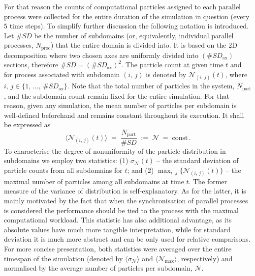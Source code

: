 \documentclass{pracamgren}
\begin{document}
For that reason the counts of computational particles assigned to each parallel process were collected for the entire duration of the simulation in question (every $5$ time steps).
To simplify further discussion the following notation is introduced.
Let $\#SD$ be the number of subdomains (or, equivalently, individual parallel processes, $N_{\text{proc}}$) that the entire domain is divided into.
It is based on the 2D decomposition where two chosen axes are uniformly divided into $(\#SD_{\text{ax}})$ sections, therefore $\#SD = \left( \#SD_{\text{ax}} \right)^2$.
The particle count at given time $t$ and for process associated with subdomain $(i,\,j)$ is denoted by $\mathcal{N}_{(i,\,j)}(t)$, where $i,\,j \in \{ 1, \, \ldots , \, \#SD_{\text{ax}} \}$.
Note that the total number of particles in the system, $N_{\text{part}}$, and the subdomain count remain fixed for the entire simulation.
For that reason, given any simulation, the mean number of particles per subdomain is well-defined beforehand and remains constant throughout its execution.
It shall be expressed as 
\begin{equation}
\langle \mathcal{N}_{(i,\,j)}(t) \rangle \; = \; \frac{N_{\text{part}}}{\#SD} \; := \; \mathcal{N} \; = \; \text{const} \, .
\label{eqn:pfp-avg}
\end{equation}
To characterise the degree of nonuniformity of the particle distribution in subdomains we employ two statistics: (1) $\sigma_{\mathcal{N}}(t)$ -- the standard deviation of particle counts from all subdomains for $t$; and (2) $\max_{i,\,j}\{\mathcal{N}_{(i,\,j)}(t)\}$ -- the maximal number of particles among all subdomains at time $t$.
The former measure of the variance of distribution is self-explanatory.
As for the latter, it is mainly motivated by the fact that when the synchronisation of parallel processes is considered the performance should be tied to the process with the maximal computational workload.
This statistic has also additional advantage, as its absolute values have much more tangible interpretation, while for standard deviation it is much more abstract and can be only used for relative comparisons. 
For more concise presentation, both statistics were averaged over the entire timespan of the simulation (denoted by $\langle \sigma_{\mathcal{N}} \rangle$ and $\langle \mathcal{N}_{\max} \rangle$, respectively) and normalised by the average number of particles per subdomain, $\mathcal{N}$.

\medskip
\end{document}
